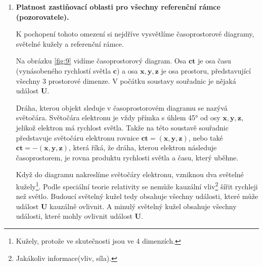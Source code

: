 \begin{enumerate}
    \item \textbf{Platnost zastiňovací oblasti pro všechny referenční rámce (pozorovatele).}

    K pochopení tohoto omezení si nejdříve vysvětlíme časoprostorové diagramy, světelné kužely a referenční rámce.

    Na obrázku \ref{fig:9} vidíme časoprostorový diagram. Osa $\bm{ct}$ je osa času (vynásobeného rychlostí světla $\bm{c}$) a osa $\bm{x,y,z}$ je osa prostoru, představující všechny 3 prostorové dimenze. V počátku soustavy souřadnic je nějaká událost $\bm{U}$. 
    
    Dráha, kterou objekt sleduje v časoprostorovém diagramu se nazývá světočára. Světočára elektronu je vždy přímka s úhlem 45° od osy $\bm{x,y,z}$, jelikož elektron má rychlost světla. Takže na této soustavě souřadnic představuje světočáru elektronu rovnice $\bm{ct=(x,y,z)}$, nebo také $\bm{ct=-(x,y,z)}$, která říká, že dráha, kterou elektron následuje časoprostorem, je rovna produktu rychlosti světla a času, který uběhne.

    Když do diagramu nakreslíme světočáry elektronu, vzniknou dva světelné kužely\footnote[6]{Kužely, protože ve skutečnosti jsou ve 4 dimenzích.}. Podle speciální teorie relativity\parencite{SpRel} se nemůže kauzální vliv\footnote[7]{Jakákoliv informace(vliv, síla).} šířit rychleji než světlo. Budoucí světelný kužel tedy obsahuje všechny události, které může událost $\bm{U}$ kauzálně ovlivnit. A minulý světelný kužel obsahuje všechny události, které mohly ovlivnit událost $\bm{U}$.

    \clearpage

    \begin{figure}[ht]

        \centering
    
\end{figure}
\end{enumerate}
